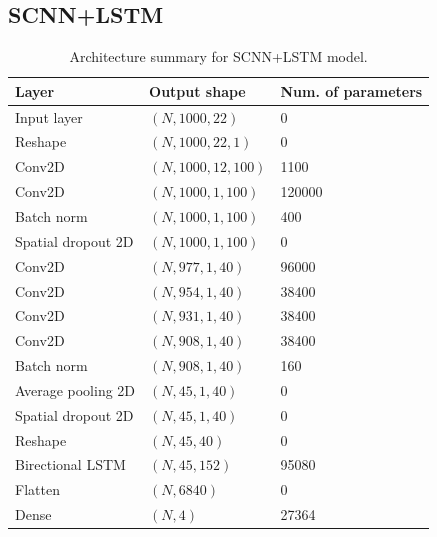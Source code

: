 \documentclass{article}
\begin{document}
\subsection{SCNN+LSTM}
\begin{table}[H]
\begin{center}
    \begin{tabular}{|l|l|l|}
        \hline
        Layer   & Output shape  & Num. of parameters \\
        \hline\hline
        Input layer         & $(N, 1000, 22)$       & 0         \\
        Reshape             & $(N, 1000, 22, 1)$    & 0         \\
        Conv2D              & $(N, 1000, 12, 100)$  & 1100      \\
        Conv2D              & $(N, 1000, 1, 100)$   & 120000    \\
        Batch norm          & $(N, 1000, 1, 100)$   & 400       \\
        Spatial dropout 2D  & $(N, 1000, 1, 100)$   & 0         \\
        Conv2D              & $(N, 977, 1, 40)$     & 96000     \\
        Conv2D              & $(N, 954, 1,40)$      & 38400     \\
        Conv2D              & $(N, 931, 1, 40)$     & 38400     \\
        Conv2D              & $(N, 908, 1, 40)$     & 38400     \\
        Batch norm          & $(N, 908, 1, 40)$     & 160       \\
        Average pooling 2D  & $(N, 45, 1, 40)$      & 0         \\
        Spatial dropout 2D  & $(N, 45, 1, 40)$      & 0         \\
        Reshape             & $(N, 45, 40)$         & 0         \\
        Birectional LSTM    & $(N, 45, 152)$        & 95080     \\
        Flatten             & $(N, 6840)$           & 0         \\
        Dense               & $(N, 4)$              & 27364     \\
        \hline
    \end{tabular}
\end{center}
\caption{Architecture summary for SCNN+LSTM model.}
\label{tab:lstm}
\end{table}
\end{document}
